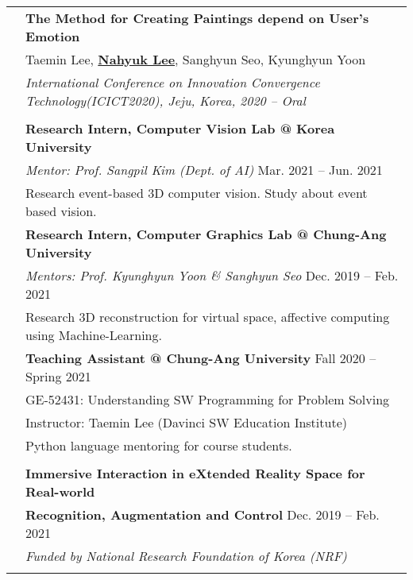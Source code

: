 \documentclass[letterpaper, 11pt]{article}
\begin{document}
\begin{longtable}{p{1.3in}p{4.8in}}
& \textbf{The Method for Creating Paintings depend on User's Emotion} \\
& Taemin Lee, \uline{\textbf{Nahyuk Lee}}, Sanghyun Seo, Kyunghyun Yoon \\
& \textit{International Conference on Innovation Convergence Technology(ICICT2020), Jeju, Korea, 2020 -- Oral}\\
& \\



\nohyphens{\color{OliveGreen}{Research experience}} 
& \textbf{Research Intern, Computer Vision Lab @ Korea University} \\
& {\it Mentor: Prof. Sangpil Kim (Dept. of AI)} \hfill Mar. 2021 -- Jun. 2021 \\
& Research event-based 3D computer vision. Study about event based vision.
& \\


& \textbf{Research Intern, Computer Graphics Lab @ Chung-Ang University} \\
& {\it Mentors: Prof. Kyunghyun Yoon \& Sanghyun Seo}  \hfill Dec. 2019 -- Feb. 2021 \\
& Research 3D reconstruction for virtual space, affective computing using Machine-Learning.
& \\


{\color{OliveGreen}{Teaching experience}} 
& \textbf{Teaching Assistant @ Chung-Ang University} \hfill Fall 2020 -- Spring 2021 \\
& GE-52431: Understanding SW Programming for Problem Solving \\
& Instructor: Taemin Lee (Davinci SW Education Institute) \\
& Python language mentoring for course students.\\
& \\



{\color{OliveGreen}{Project experience}} 
& {\textbf{Immersive Interaction in eXtended Reality Space for Real-world}} \\
& {\textbf{Recognition, Augmentation and Control}} \hfill Dec. 2019 -- Feb. 2021 \\
& {\it Funded by National Research Foundation of Korea (NRF)}  \\
& \\


\end{longtable}
\end{document}
